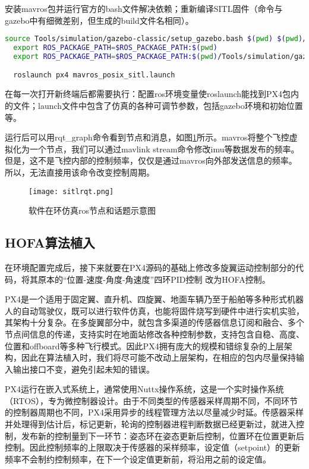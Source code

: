安装mavros包并运行官方的bash文件解决依赖；重新编译SITL固件（命令与gazebo中有细微差别，但生成的build文件名相同）。

  \begin{lstlisting}[language=Bash, basicstyle=\footnotesize, linewidth=\linewidth, breaklines=true]
  source Tools/simulation/gazebo-classic/setup_gazebo.bash $(pwd) $(pwd)/build/px4_sitl_default
  export ROS_PACKAGE_PATH=$ROS_PACKAGE_PATH:$(pwd)
  export ROS_PACKAGE_PATH=$ROS_PACKAGE_PATH:$(pwd)/Tools/simulation/gazebo-classic/sitl_gazebo-classic

  roslaunch px4 mavros_posix_sitl.launch
\end{lstlisting}

在每一次打开新终端后都需要执行：配置ros环境变量使roslaunch能找到PX4包内的文件；launch文件中包含了仿真的各种可调节参数，包括gazebo环境和初始位置等。

运行后可以用rqt\_graph命令看到节点和消息，如图\ref{sitlrqt}所示。mavros将整个飞控虚拟化为一个节点，我们可以通过mavlink stream命令修改imu等数据发布的频率。但是，这不是飞控内部的控制频率，仅仅是通过mavros向外部发送信息的频率。所以，无法直接用该命令改变控制周期。
\begin{figure}[!h]
  \centering
  \texttt{[image: sitlrqt.png]}
  \caption{软件在环仿真ros节点和话题示意图}
  \label{sitlrqt}
\end{figure}

 \subsection{HOFA算法植入}
在环境配置完成后，接下来就要在PX4源码的基础上修改多旋翼运动控制部分的代码，将其原本的“位置-速度-角度-角速度”四环PID控制 \cite{px4控制}改为HOFA控制。

PX4是一个适用于固定翼、直升机、四旋翼、地面车辆乃至于船舶等多种形式机器人的自动驾驶仪，既可以进行软件仿真，也能将固件烧写到硬件中进行实机实验，其架构十分复杂。在多旋翼部分中，就包含多渠道的传感器信息订阅和融合、多个节点间信息的传递，支持实时在地面站修改各种控制参数，支持包含自稳、高度、位置和offboard等多种飞行模式。因此PX4拥有庞大的规模和错综复杂的上层架构，因此在算法植入时，我们将尽可能不改动上层架构，在相应的包内尽量保持输入输出接口不变，避免引起未知的错误。

PX4运行在嵌入式系统上，通常使用Nuttx操作系统，这是一个实时操作系统（RTOS），专为微控制器设计。由于不同类型的传感器采样周期不同，不同环节的控制器周期也不同，PX4采用异步的线程管理方法以尽量减少时延。传感器采样并处理得到估计后，标记更新，轮询的控制器进程判断数据已经更新过，就进入控制，发布新的控制量到下一环节：姿态环在姿态更新后控制，位置环在位置更新后控制。因此控制频率的上限取决于传感器的采样频率，设定值（setpoint）的更新频率不会制约控制频率，在下一个设定值更新前，将沿用之前的设定值。

